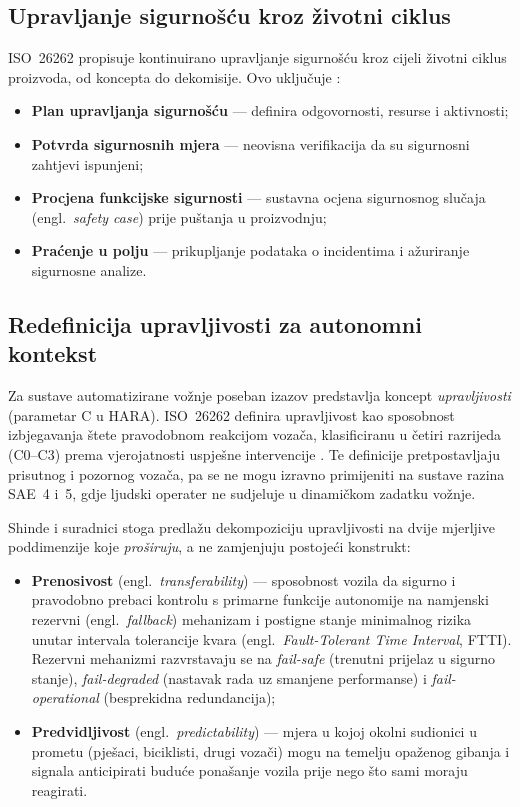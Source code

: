 \subsection{Upravljanje sigurnošću kroz životni ciklus}

ISO~26262 propisuje kontinuirano upravljanje sigurnošću kroz cijeli životni ciklus proizvoda, od koncepta do dekomisije. Ovo uključuje \cite{iso26262}:

\begin{itemize}
  \item \textbf{Plan upravljanja sigurnošću} — definira odgovornosti, resurse i aktivnosti;
  \item \textbf{Potvrda sigurnosnih mjera} — neovisna verifikacija da su sigurnosni zahtjevi ispunjeni;
  \item \textbf{Procjena funkcijske sigurnosti} — sustavna ocjena sigurnosnog slučaja (engl.\ \textit{safety case}) prije puštanja u proizvodnju;
  \item \textbf{Praćenje u polju} — prikupljanje podataka o incidentima i ažuriranje sigurnosne analize.
\end{itemize}

\subsection{Redefinicija upravljivosti za autonomni kontekst}
\label{subsec:upravljivost}

Za sustave automatizirane vožnje poseban izazov predstavlja koncept \textit{upravljivosti} (parametar C u HARA). ISO~26262 definira upravljivost kao sposobnost izbjegavanja štete pravodobnom reakcijom vozača, klasificiranu u četiri razrijeda (C0--C3) prema vjerojatnosti uspješne intervencije \cite{shinde2026reimagining}. Te definicije pretpostavljaju prisutnog i pozornog vozača, pa se ne mogu izravno primijeniti na sustave razina SAE~4 i~5, gdje ljudski operater ne sudjeluje u dinamičkom zadatku vožnje.

Shinde i suradnici \cite{shinde2026reimagining} stoga predlažu dekompoziciju upravljivosti na dvije mjerljive poddimenzije koje \textit{proširuju}, a ne zamjenjuju postojeći konstrukt:
\begin{itemize}
  \item \textbf{Prenosivost} (engl.\ \textit{transferability}) — sposobnost vozila da sigurno i pravodobno prebaci kontrolu s primarne funkcije autonomije na namjenski rezervni (engl.\ \textit{fallback}) mehanizam i postigne stanje minimalnog rizika unutar intervala tolerancije kvara (engl.\ \textit{Fault-Tolerant Time Interval}, FTTI). Rezervni mehanizmi razvrstavaju se na \textit{fail-safe} (trenutni prijelaz u sigurno stanje), \textit{fail-degraded} (nastavak rada uz smanjene performanse) i \textit{fail-operational} (besprekidna redundancija);
  \item \textbf{Predvidljivost} (engl.\ \textit{predictability}) — mjera u kojoj okolni sudionici u prometu (pješaci, biciklisti, drugi vozači) mogu na temelju opaženog gibanja i signala anticipirati buduće ponašanje vozila prije nego što sami moraju reagirati.
\end{itemize}

